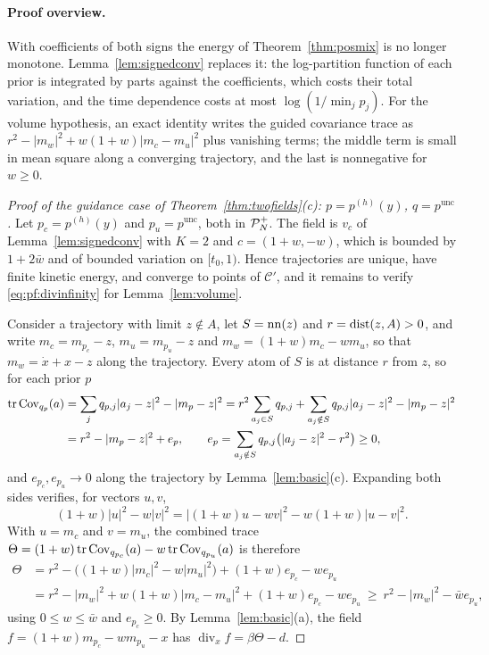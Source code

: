 \documentclass{article} %
\theoremstyle{plain}
\theoremstyle{definition}
\theoremstyle{remark}
\begin{document}
\label{apx:pf-schedule}
\thmtwofields*
\paragraph{Proof overview.} With coefficients of both signs the energy of
Theorem~\ref{thm:posmix} is no longer monotone. Lemma~\ref{lem:signedconv} replaces it: the
log-partition function of each prior is integrated by parts against the coefficients, which costs
their total variation, and the time dependence costs at most $\log(1/\min_jp_j)$. For the volume
hypothesis, an exact identity writes the guided covariance trace as
$r^2-|m_w|^2+w(1+w)|m_c-m_u|^2$ plus vanishing terms; the middle term is small in mean
square along a converging trajectory, and the last is nonnegative for $w\ge0$.
\begin{proof}[Proof of the guidance case of Theorem~\ref{thm:twofields}(c): $p=p^{(h)}(y)$, $q=p^{\mathrm{unc}}$]
Let $p_c=p^{(h)}(y)$ and $p_u=p^{\mathrm{unc}}$, both in $\mathcal{P}_N^{+}$. The field is $v_c$ of
Lemma~\ref{lem:signedconv} with $K=2$ and $c=(1+w,-w)$, which is bounded by $1+2\bar w$ and of
bounded variation on $[t_0,1)$. Hence trajectories are unique, have finite kinetic energy, and
converge to points of $\mathcal C'$, and it remains to verify \eqref{eq:pf:divinfinity} for
Lemma~\ref{lem:volume}.

Consider a trajectory with limit $z\notin A$, let $S=\operatorname{nn}(z)$ and $r=\operatorname{dist}(z,A)>0$, and write
$m_c=m_{p_c}-z$, $m_u=m_{p_u}-z$ and $m_w=(1+w)m_c-wm_u$, so that $m_w=\dot x+x-z$
along the trajectory. Every atom of $S$ is at distance $r$ from $z$, so for each prior $p$
\begin{align*}
\operatorname{tr}\operatorname{Cov}_{q_p}(a)
&=\sum_jq_{p,j}|a_j-z|^2-|m_p-z|^2
=r^2\sum_{a_j\in S}q_{p,j}+\sum_{a_j\notin S}q_{p,j}|a_j-z|^2-|m_p-z|^2\\
&=r^2-|m_p-z|^2+e_p,\qquad
e_p=\sum_{a_j\notin S}q_{p,j}\bigl(|a_j-z|^2-r^2\bigr)\ge0,
\end{align*}
and $e_{p_c},e_{p_u}\to0$ along the trajectory by Lemma~\ref{lem:basic}(c). Expanding both sides
verifies, for vectors $u,v$,
\[
(1+w)|u|^2-w|v|^2=|(1+w)u-wv|^2-w(1+w)|u-v|^2 .
\]
With $u=m_c$ and $v=m_u$, the combined trace
$\Theta=(1+w)\operatorname{tr}\operatorname{Cov}_{q_{p_c}}(a)-w\operatorname{tr}\operatorname{Cov}_{q_{p_u}}(a)$ is therefore
\begin{align*}
\Theta
&=r^2-\bigl((1+w)|m_c|^2-w|m_u|^2\bigr)+(1+w)e_{p_c}-we_{p_u}\\
&=r^2-|m_w|^2+w(1+w)|m_c-m_u|^2+(1+w)e_{p_c}-we_{p_u}
\ \ge\ r^2-|m_w|^2-\bar we_{p_u},
\end{align*}
using $0\le w\le\bar w$ and $e_{p_c}\ge0$. By Lemma~\ref{lem:basic}(a), the field
$f=(1+w)m_{p_c}-wm_{p_u}-x$ has $\operatorname{div}_xf=\beta\Theta-d$.


\end{proof}
\end{document}
